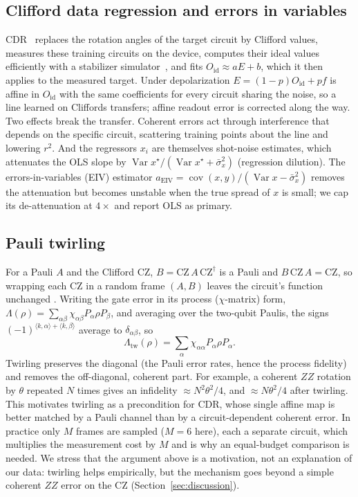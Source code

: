 \documentclass[conference]{IEEEtran}
\newcommand{\Oid}{O_{\mathrm{id}}}
\newcommand{\CZ}{\mathrm{CZ}}
\newcommand{\Var}{\operatorname{Var}}
\newcommand{\Cov}{\operatorname{cov}}
\begin{document}
\subsection{Clifford data regression and errors in variables}
CDR~\cite{czarnik2021,lowe2021,bultrini2023} replaces the rotation angles of the target circuit
by Clifford values, measures these training circuits on the device, computes their ideal
values efficiently with a stabilizer simulator~\cite{gottesman1998,aaronson2004}, and fits
$\Oid\approx aE+b$, which it then applies to the measured target. Under depolarization
$E=(1-p)\Oid+pf$ is affine in $\Oid$ with the same coefficients for every circuit sharing the
noise, so a line learned on Cliffords transfers; affine readout error is corrected along
the way. Two effects break the transfer. Coherent errors act through interference that
depends on the specific circuit, scattering training points about the line and lowering
$r^2$. And the regressors $x_i$ are themselves shot-noise estimates, which attenuates the OLS
slope by $\Var x^\star/(\Var x^\star+\bar\sigma_x^2)$ (regression dilution). The
errors-in-variables (EIV) estimator $a_{\text{EIV}}=\Cov(x,y)/(\Var x-\bar\sigma_x^2)$
\cite{fuller1987} removes the attenuation but becomes unstable when the true spread of $x$ is
small; we cap its de-attenuation at $4\times$ and report OLS as primary.

\subsection{Pauli twirling}
For a Pauli $A$ and the Clifford CZ, $B=\CZ\,A\,\CZ^\dagger$ is a Pauli and $B\,\CZ\,A=\CZ$,
so wrapping each CZ in a random frame $(A,B)$ leaves the circuit's function unchanged
\cite{wallman2016,hashim2021}. Writing the gate error in its process ($\chi$-matrix) form,
$\Lambda(\rho)=\sum_{\alpha\beta}\chi_{\alpha\beta}P_\alpha\rho P_\beta$, and averaging over the
two-qubit Paulis, the signs $(-1)^{\langle k,\alpha\rangle+\langle k,\beta\rangle}$ average to
$\delta_{\alpha\beta}$, so
\begin{equation}
  \Lambda_{\text{tw}}(\rho)=\sum_\alpha\chi_{\alpha\alpha}P_\alpha\rho P_\alpha .
\end{equation}
Twirling preserves the diagonal (the Pauli error rates, hence the process fidelity) and
removes the off-diagonal, coherent part. For example, a coherent $ZZ$ rotation by $\theta$
repeated $N$ times gives an infidelity $\approx N^2\theta^2/4$, and $\approx N\theta^2/4$ after
twirling. This motivates twirling as a precondition for CDR, whose single affine map is
better matched by a Pauli channel than by a circuit-dependent coherent error. In practice
only $M$ frames are sampled ($M=6$ here), each a separate circuit, which multiplies the
measurement cost by $M$ and is why an equal-budget comparison is needed. We stress that the
argument above is a motivation, not an explanation of our data: twirling helps empirically,
but the mechanism goes beyond a simple coherent $ZZ$ error on the CZ (Section~\ref{sec:discussion}).
\end{document}
